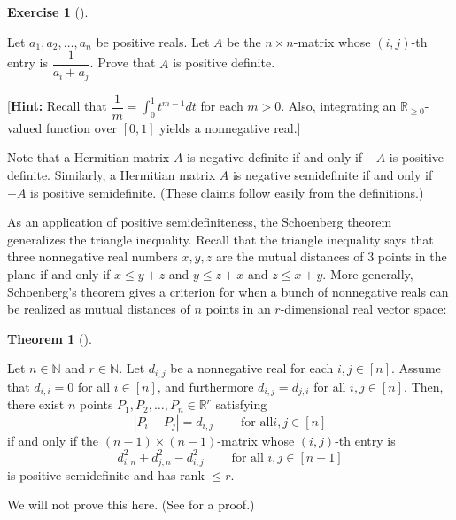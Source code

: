 \documentclass[numbers=enddot,12pt,final,onecolumn,notitlepage]{scrartcl}%
\newcounter{exer}
\numberwithin{exer}{subsection}
\theoremstyle{definition}
\newtheorem{theo}{Theorem}[subsection]
\newenvironment{theorem}[1][]
{\begin{theo}[#1]\begin{leftbar}}
{\end{leftbar}\end{theo}}
\newtheorem{exmp}[exer]{Exercise}
\newenvironment{exercise}[1][]
{\begin{exmp}[#1]\begin{leftbar}}
{\end{leftbar}\end{exmp}}
\begin{document}
\begin{exercise}
 Let $a_{1},a_{2},\ldots,a_{n}$ be positive reals. Let $A$ be the
$n\times n$-matrix whose $\left(  i,j\right)  $-th entry is $\dfrac{1}%
{a_{i}+a_{j}}$. Prove that $A$ is positive definite. \medskip

[\textbf{Hint:} Recall that $\dfrac{1}{m}=\int_{0}^{1}t^{m-1}dt$ for each
$m>0$. Also, integrating an $\mathbb{R}_{\geq0}$-valued function over $\left[
0,1\right]  $ yields a nonnegative real.]
\end{exercise}

Note that a Hermitian matrix $A$ is negative definite if and only if $-A$ is
positive definite. Similarly, a Hermitian matrix $A$ is negative semidefinite
if and only if $-A$ is positive semidefinite. (These claims follow easily from
the definitions.)

As an application of positive semidefiniteness, the Schoenberg theorem
generalizes the triangle inequality. Recall that the triangle inequality says
that three nonnegative real numbers $x,y,z$ are the mutual distances of $3$
points in the plane if and only if $x\leq y+z$ and $y\leq z+x$ and $z\leq
x+y$. More generally, Schoenberg's theorem gives a criterion for when a bunch
of nonnegative reals can be realized as mutual distances of $n$ points in an
$r$-dimensional real vector space:

\begin{theorem}
[Schoenberg's theorem]Let $n\in\mathbb{N}$ and $r\in\mathbb{N}$. Let $d_{i,j}$
be a nonnegative real for each $i,j\in\left[  n\right]  $. Assume that
$d_{i,i}=0$ for all $i\in\left[  n\right]  $, and furthermore $d_{i,j}%
=d_{j,i}$ for all $i,j\in\left[  n\right]  $. Then, there exist $n$ points
$P_{1},P_{2},\ldots,P_{n}\in\mathbb{R}^{r}$ satisfying%
\[
\left\vert P_{i}-P_{j}\right\vert =d_{i,j}\ \ \ \ \ \ \ \ \ \ \text{for all
}i,j\in\left[  n\right]
\]
if and only if the $\left(  n-1\right)  \times\left(  n-1\right)  $-matrix
whose $\left(  i,j\right)  $-th entry is
\[
d_{i,n}^{2}+d_{j,n}^{2}-d_{i,j}^{2}\ \ \ \ \ \ \ \ \ \ \text{for all }%
i,j\in\left[  n-1\right]
\]
is positive semidefinite and has rank $\leq r$.
\end{theorem}

We will not prove this here. (See \cite[Theorem 7.1]{LibLav15} for a proof.)
\end{document}
